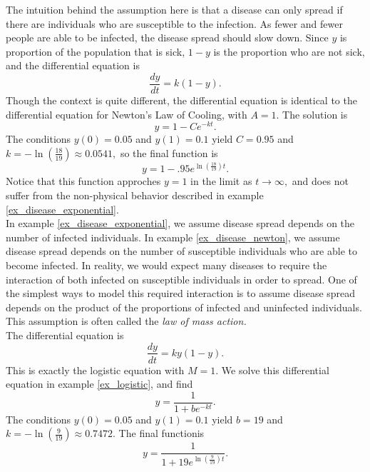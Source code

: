 {The intuition behind the assumption here is that a disease can only spread if there are individuals who are susceptible to the infection.  As fewer and fewer people are able to be infected, the disease spread should slow down.  Since $y$ is proportion of the population that is sick, $1-y$ is the proportion who are not sick, and the differential equation is
	\[
		\frac{dy}{dt} = k(1-y).
	\]
Though the context is quite different, the differential equation is identical to the differential equation for Newton's Law of Cooling, with $A=1$.  The solution is
	\[
		y = 1 - Ce^{-kt}.
	\]
The conditions $y(0)=0.05$ and $y(1) = 0.1$ yield $C = 0.95$ and $k = -\ln\left(\frac{18}{19}\right) \approx 0.0541,$ so the final function is
	\[
		y = 1-.95e^{\ln\left(\frac{18}{19}\right)t}.
	\]
Notice that this function approches $y=1$ in the limit as $t \to \infty,$ and does not suffer from the non-physical behavior described in example \ref{ex_disease_exponential}.
}\\

In example \ref{ex_disease_exponential}, we assume disease spread depends on the number of infected individuals.  In example \ref{ex_disease_newton}, we assume disease spread depends on the number of susceptible individuals who are able to become infected.  In reality, we would expect many diseases to require the interaction of both infected on susceptible individuals in order to spread.  One of the simplest ways to model this required interaction is to assume disease spread depends on the product of the proportions of infected and uninfected individuals.  This assumption is often called the \emph{law of mass action.}\\

{The differential equation is
	\[
		\frac{dy}{dt} = ky(1-y).
	\]
This is exactly the logistic equation with $M = 1.$  We solve this differential equation in example \ref{ex_logistic}, and find
	\[
		y = \frac{1}{1 + be^{-kt}}.
	\]
The conditions $y(0)=0.05$ and $y(1) = 0.1$ yield $b = 19$ and $k = -\ln\left(\frac{9}{19}\right) \approx 0.7472.$  The final functionis
	\[
		y = \frac{1}{1+19e^{\ln\left(\frac{9}{19}\right)t}}.
	\]
}

